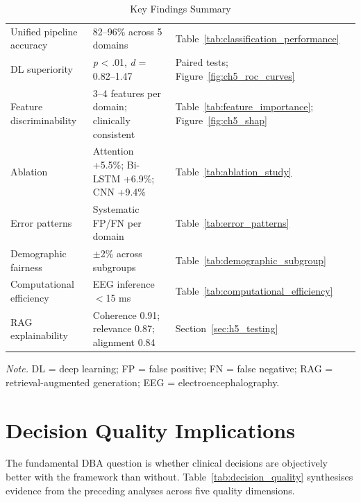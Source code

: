 \begin{table}[H]
\footnotesize
\tablestripes
\begin{tabularx}{\textwidth}{L L L}
\toprule
{} &  &  \\
\midrule
Unified pipeline accuracy & 82--96\% across 5 domains & Table~\ref{tab:classification_performance} \\
\addlinespace
DL superiority & \textit{p} < .01, \textit{d} = 0.82--1.47 & Paired tests; Figure~\ref{fig:ch5_roc_curves} \\
\addlinespace
Feature discriminability & 3--4 features per domain; clinically consistent & Table~\ref{tab:feature_importance}; Figure~\ref{fig:ch5_shap} \\
\addlinespace
Ablation & Attention +5.5\%; Bi-LSTM +6.9\%; CNN +9.4\% & Table~\ref{tab:ablation_study} \\
\addlinespace
Error patterns & Systematic FP/FN per domain & Table~\ref{tab:error_patterns} \\
\addlinespace
Demographic fairness & $\pm$2\% across subgroups & Table~\ref{tab:demographic_subgroup} \\
\addlinespace
Computational efficiency & EEG inference $<$15 ms & Table~\ref{tab:computational_efficiency} \\
\addlinespace
RAG explainability & Coherence 0.91; relevance 0.87; alignment 0.84 & Section~\ref{sec:h5_testing} \\
\bottomrule
\end{tabularx}
\caption{Key Findings Summary}
\label{tab:key_findings_summary}
\vspace{0.5em}\noindent\textit{Note.} DL = deep learning; FP = false positive; FN = false negative; RAG = retrieval-augmented generation; EEG = electroencephalography.
\end{table}


\section{Decision Quality Implications}
\label{sec:decision_quality}

The fundamental DBA question is whether clinical decisions are objectively better with the framework than without. Table~\ref{tab:decision_quality} synthesises evidence from the preceding analyses across five quality dimensions.

